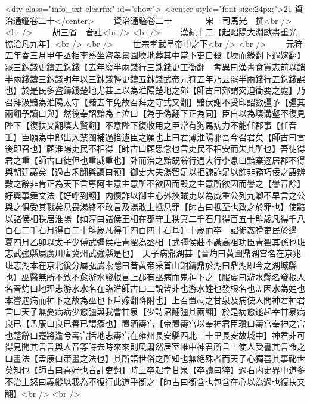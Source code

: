 <div class="info_txt clearfix" id="show">
<center style="font-size:24px;">21-資治通鑑卷二十</center>
  　　資治通鑑卷二十　　　　宋　司馬光　撰<br />
<br />
　　胡三省　音註<br />
<br />
　　漢紀十二【起昭陽大淵獻盡重光協洽凡九年】<br />
<br />
　　世宗孝武皇帝中之下<br />
<br />
　　元狩五年春三月甲午丞相李蔡坐盗孝景園堧地葬其中當下吏自殺【堧而緣翻下遐嫁翻】　罷三銖錢更鑄五銖錢【去年廢半兩錢行三銖錢更工衡翻　考異曰漢書食貨志前以銷半兩錢鑄三銖錢明年以三銖錢輕更鑄五銖錢武帝元狩五年乃云罷半兩錢行五銖錢誤也】於是民多盗鑄錢楚地尤甚上以為淮陽楚地之郊【師古曰郊謂交迫衝要之處】乃召拜汲黯為淮陽太守【黯去年免故召拜之守式又翻】黯伏謝不受印詔數彊予【彊其兩翻予讀曰與】然後奉詔黯為上泣曰【為于偽翻下正為同】臣自以為填溝壑不復見陛下【復扶又翻填大賢翻】不意陛下復收用之臣常有狗馬病力不能任郡事【任音壬】臣願為中郎出入禁闥補過拾遺臣之願也上曰君薄淮陽邪吾今召君矣【師古曰言後即召也】顧淮陽吏民不相得【師古曰顧思念也言吏民不相安而失其所也】吾徒得君之重【師古曰徒但也重威重也】卧而治之黯既辭行過大行李息曰黯棄逐居郡不得與朝廷議矣【過古禾翻與讀曰預】御史大夫湯智足以拒諫詐足以飾非務巧佞之語辨數之辭非肯正為天下言專阿主意主意所不欲因而毁之主意所欲因而譽之【譽音餘】好興事舞文法【好呼到翻】内懷詐以御主心外挾賊吏以為威重公列九卿不早言之公與之俱受其戮矣息畏湯終不敢言及湯敗上抵息罪【師古曰抵至也致之於罪也】使黯以諸侯相秩居淮陽【如淳曰諸侯王相在郡守上秩真二千石月得百五十斛歲凡得千八百石二千石月得百二十斛歲凡得千四百四十石耳】十歲而卒　詔徙姦猾吏民於邊　夏四月乙卯以太子少傅武彊侯莊青翟為丞相【武彊侯莊不識高祖功臣青翟其孫也班志武強縣屬廣川唐冀州武強縣是也】　天子病鼎湖甚【晉灼曰黄圖鼎湖宫名在京兆班志湖本在京北後分屬弘農索隱曰昔黄帝采首山銅鑄鼎於湖曰鼎湖即今之湖城縣也】巫醫無所不致不愈游水發根言上郡有巫病而鬼神下之【服䖍曰游水縣名發根人名晉灼曰地理志游水水名在臨淮師古曰二說皆非也游水姓也發根名也盖因水為姓也本嘗遇病而神下之故為巫也下戶嫁翻降附也】上召置祠之甘泉及病使人問神君神君言曰天子無憂病病少愈彊與我會甘泉【少詩沼翻彊其兩翻】於是病愈遂起幸甘泉病良已【孟康曰良已善已謂瘉也】置酒夀宫【帝置夀宫以奉神君臣瓚曰壽宫奉神之宫也楚辭曰蹇將澹兮壽宫括地志夀宫在雍州長安縣西北三十里長安故城中】神君非可得見聞其言言與人音等時去時來來則風肅然居室帷中神君所言上使人受書其言命之曰畫法【孟康曰策畫之法也】其所語世俗之所知也無絶殊者而天子心獨喜其事祕世莫知也【師古曰喜好也音計吏翻】時上卒起幸甘泉【卒讀曰猝】過右内史界中道多不治上怒曰義縱以我為不復行此道乎銜之【師古曰銜含也包含在心以為過也復扶又翻】<br />
<br />
